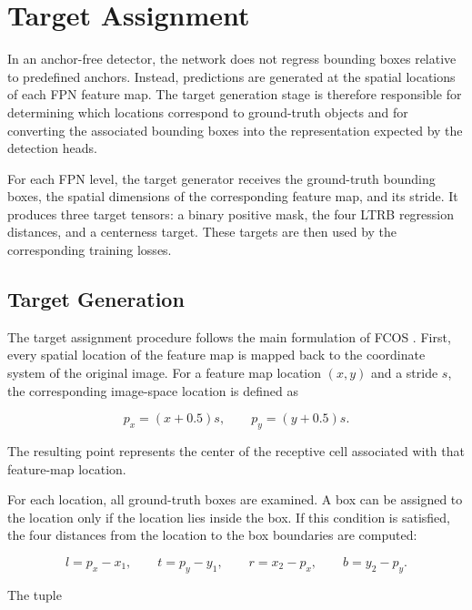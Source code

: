 \documentclass[11pt,a4paper]{article}
\begin{document}
\section{Target Assignment}
\label{sec:target_assignment}

In an anchor-free detector, the network does not regress bounding boxes
relative to predefined anchors. Instead, predictions are generated at the
spatial locations of each FPN feature map. The target generation stage is
therefore responsible for determining which locations correspond to
ground-truth objects and for converting the associated bounding boxes into
the representation expected by the detection heads.

For each FPN level, the target generator receives the ground-truth bounding
boxes, the spatial dimensions of the corresponding feature map, and its
stride. It produces three target tensors: a binary positive mask, the four
LTRB regression distances, and a centerness target. These targets are then
used by the corresponding training losses.

\subsection{Target Generation}
\label{subsec:target_generation}

The target assignment procedure follows the main formulation of FCOS
\cite{tian2019fcos}. First, every spatial location of the feature map is
mapped back to the coordinate system of the original image. For a feature
map location $(x,y)$ and a stride $s$, the corresponding image-space
location is defined as

\begin{equation}
p_x = (x + 0.5)s,
\qquad
p_y = (y + 0.5)s.
\end{equation}

The resulting point represents the center of the receptive cell associated
with that feature-map location.

For each location, all ground-truth boxes are examined. A box can be assigned
to the location only if the location lies inside the box. If this condition
is satisfied, the four distances from the location to the box boundaries are
computed:

\begin{equation}
l = p_x - x_1,
\qquad
t = p_y - y_1,
\qquad
r = x_2 - p_x,
\qquad
b = y_2 - p_y.
\end{equation}

The tuple
\end{document}
